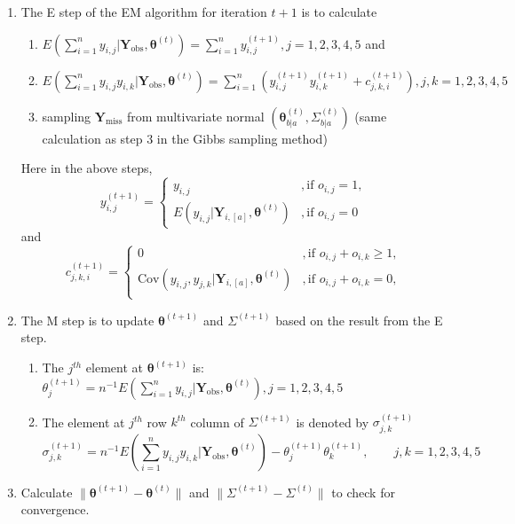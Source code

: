 \documentclass[12pt]{article}
\begin{document}
\begin{enumerate}
	\item The E step of the EM algorithm for iteration $t+1$ is to calculate
\begin{enumerate}
	\item $E\left( \sum_{i=1}^{n} y_{i,j}|\mathbf{Y}_{\text{obs}}, \boldsymbol{\theta}^{(t)} \right) = \sum_{i=1}^{n} y_{i,j}^{(t+1)}, j=1,2,3,4,5$ and
	\item $E\left( \sum_{i=1}^{n} y_{i,j}y_{i,k}|\mathbf{Y}_{\text{obs}}, \boldsymbol{\theta}^{(t)} \right) = \sum_{i=1}^{n} \left( y_{i,j}^{(t+1)}y_{i,k}^{(t+1)}+c_{j,k,i}^{(t+1)} \right) , j,k=1,2,3,4,5$
	\item sampling $\mathbf{Y}_{\text{miss}}$ from multivariate normal $\left( \boldsymbol{\theta}_{b|a}^{(t)},  \Sigma_{b|a}^{(t)} \right) $ (same calculation as step 3 in the Gibbs sampling method)
\end{enumerate}
Here in the above steps,
\[
y_{i,j}^{(t+1)} = \begin{cases}
	y_{i,j} &,\text{if } o_{i,j} = 1,\\
	E\left( y_{i,j}| \mathbf{Y}_{i,[a]}, \boldsymbol{\theta}^{(t)}\right) &,\text{if } o_{i,j} = 0
\end{cases}
\] and
\[
c_{j,k,i}^{(t+1)} = \begin{cases}
0	&,\text{if } o_{i,j} + o_{i,k} \geq 1,\\
\text{Cov}(y_{i,j}, y_{j,k}|\mathbf{Y}_{i,[a]}, \boldsymbol{\theta}^{(t)}) &,\text{if } o_{i,j} + o_{i,k} = 0,\\
\end{cases}
\]
\item The M step is to update $\boldsymbol{\theta}^{(t+1)}$ and $\Sigma^{(t+1)}$ based on the result from the E step. 
\begin{enumerate}
	\item The $j^{th}$ element at $\boldsymbol{\theta}^{(t+1)}$ is: $\theta_j^{(t+1)} = n^{-1}E\left( \sum_{i=1}^{n} y_{i,j}|\mathbf{Y}_{\text{obs}}, \boldsymbol{\theta}^{(t)} \right), j=1,2,3,4,5$
\item The element at $j^{th}$ row $k^{th}$ column of $\Sigma^{(t+1)}$ is denoted by $\sigma_{j,k}^{(t+1)}$ 
\[
\sigma_{j,k}^{(t+1)} = n^{-1} E\left( \sum_{i=1}^{n} y_{i,j}y_{i,k}|\mathbf{Y}_{\text{obs}}, \boldsymbol{\theta}^{(t)} \right) - \theta_j^{(t+1)}\theta_k^{(t+1)},\qquad j,k=1,2,3,4,5
\] 
\end{enumerate}
\item Calculate $\|\boldsymbol{\theta}^{(t+1)} - \boldsymbol{\theta}^{(t)}\|$ and $\|\Sigma^{(t+1)}-\Sigma^{(t)}\|$ to check for convergence.
\end{enumerate}
\end{document}
